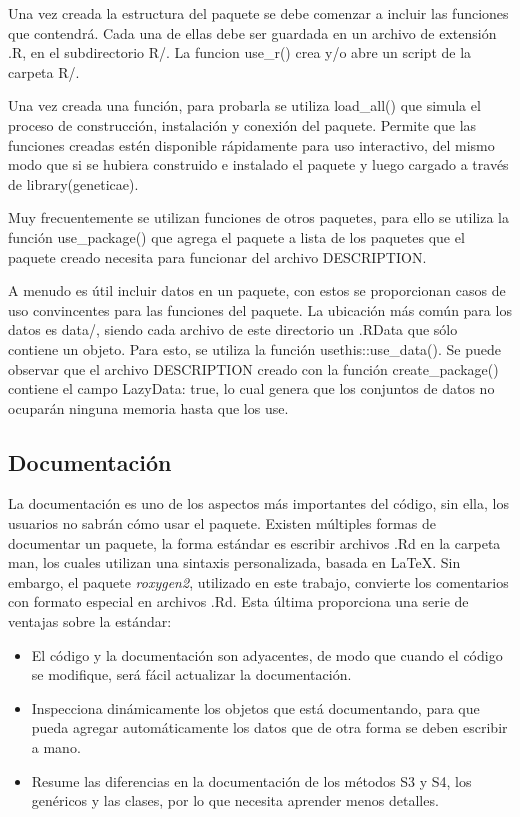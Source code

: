 Una vez creada la estructura del paquete se debe comenzar a incluir las funciones que contendrá. Cada una de ellas debe ser guardada en un archivo de extensión .R, en el subdirectorio R/. La funcion use\_r() crea y/o abre un script de la carpeta R/.

Una vez creada una función, para probarla se utiliza load\_all() que simula el proceso de construcción, instalación y conexión del paquete. Permite que las funciones creadas estén disponible rápidamente para uso interactivo, del mismo modo que si se hubiera construido e instalado el paquete y luego cargado a través de library(geneticae).

Muy frecuentemente se utilizan funciones de otros paquetes, para ello se utiliza la función use\_package() que agrega el paquete  a lista de los paquetes que el paquete creado necesita para funcionar del archivo DESCRIPTION.

A menudo es útil incluir datos en un paquete, con estos se proporcionan casos de uso convincentes para las funciones del paquete. La ubicación más común para los datos es data/, siendo cada archivo de este directorio un .RData que sólo contiene un  objeto. Para esto, se utiliza la función usethis::use\_data(). Se puede observar que el archivo DESCRIPTION creado con la función create\_package() contiene el campo LazyData: true, lo cual genera que los conjuntos de datos no ocuparán ninguna memoria hasta que los use.

\subsection{Documentación}

La documentación es uno de los aspectos más importantes del código, sin ella, los usuarios no sabrán cómo usar el paquete. Existen múltiples formas de documentar un paquete, la forma estándar es escribir archivos .Rd en la carpeta man, los cuales utilizan una sintaxis personalizada, basada en LaTeX. Sin embargo, el paquete \emph{roxygen2}, utilizado en este trabajo, convierte los comentarios con formato especial en archivos .Rd. Esta última proporciona una serie de ventajas sobre la estándar:

\begin{itemize}
\item El código y la documentación son adyacentes, de modo que cuando el código se modifique, será fácil actualizar la documentación.

\item Inspecciona dinámicamente los objetos que está documentando, para que pueda agregar automáticamente los datos que de otra forma se deben escribir a mano.

\item Resume las diferencias en la documentación de los métodos S3 y S4, los genéricos y las clases, por lo que necesita aprender menos detalles.
\end{itemize}

